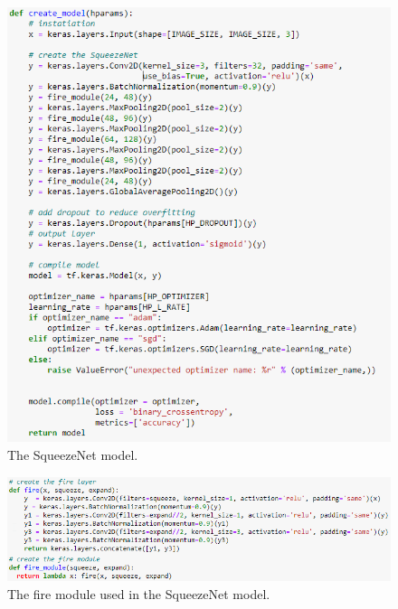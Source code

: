 \begin{figure}[H]
    \centering
    \includegraphics[width=\textwidth]{figures/squeezenet-model.png}
    \caption{The SqueezeNet model.}
    \label{fig:squeezenet-model}
\end{figure}
\begin{figure}[H]
    \centering
    \includegraphics[width=\textwidth]{figures/squeezenet-fire-module.png}
    \caption{The fire module used in the SqueezeNet model.}
    \label{fig:squeezenet-fire-module}
\end{figure}